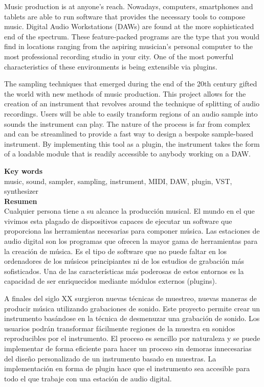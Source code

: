 \documentclass[12pt, a4paper, hidelinks]{report}
\begin{document}
	\normalsize
	Music production is at anyone's reach. Nowadays, computers, smartphones and tablets are able to run software that provides the necessary tools to compose music. Digital Audio Workstations (DAWs) are found at the more sophisticated end of the spectrum. These feature-packed programs are the type that you would find in locations ranging from the aspiring musician's personal computer to the most professional recording studio in your city. One of the most powerful characteristics of these environments is being extensible via plugins. \par 
	The sampling techniques that emerged during the end of the 20th century gifted the world with new methods of music production. This project allows for the creation of an instrument that revolves around the technique of splitting of audio recordings. Users will be able to easily transform regions of an audio sample into sounds the instrument can play. The nature of the process is far from complex and can be streamlined to provide a fast way to design a bespoke sample-based instrument. By implementing this tool as a plugin, the instrument takes the form of a loadable module that is readily accessible to anybody working on a DAW.
	
	\vspace*{\fill}
	\large
	\textbf{Key words}\\
	
	\vspace{-1em}
	\normalsize 
	\noindent music, sound, sampler, sampling, instrument, MIDI, DAW, plugin, VST, synthesizer\\
	
	\newpage
	\huge
	\textbf{Resumen}\\
	
	\normalsize
	Cualquier persona tiene a su alcance la producción musical. El mundo en el que vivimos esta plagado de dispositivos capaces de ejecutar un software que proporciona las herramientas necesarias para componer música. Las estaciones de audio digital son los programas que ofrecen la mayor gama de herramientas para la creación de música. Es el tipo de software que no puede faltar en los ordenadores de los músicos principiantes ni de los estudios de grabación más sofisticados. Una de las características más poderosas de estos entornos es la capacidad de ser enriquecidos mediante módulos externos (plugins). \par 
	A finales del siglo XX surgieron nuevas técnicas de muestreo, nuevas maneras de producir música utilizando grabaciones de sonido. Este proyecto permite crear un instrumento basándose en la técnica de desmenuzar una grabación de sonido. Los usuarios podrán transformar fácilmente regiones de la muestra en sonidos reproducibles por el instrumento. El proceso es sencillo por naturaleza y se puede implementar de forma eficiente para hacer un proceso sin demoras innecesarias del diseño personalizado de un instrumento basado en muestras. La implementación en forma de plugin hace que el instrumento sea accesible para todo el que trabaje con una estación de audio digital.
	
\end{document}
